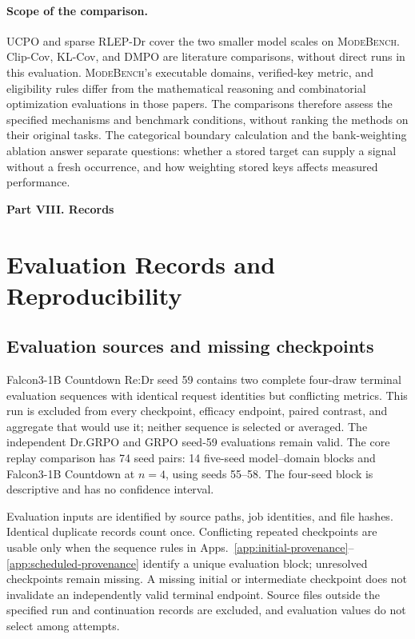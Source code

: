 \documentclass{article}
\newcommand{\1}{\mathbf 1}
\newcommand{\mb}{\textsc{ModeBench}}
\theoremstyle{remark}
\theoremstyle{definition}
\theoremstyle{plain}
\begin{document}
\paragraph{Scope of the comparison.}
UCPO and sparse RLEP-Dr cover the two smaller model scales on \mb{}.
Clip-Cov, KL-Cov, and DMPO are literature comparisons, without direct runs
in this evaluation. \mb{}'s executable domains, verified-key metric, and
eligibility rules differ from the mathematical reasoning and combinatorial
optimization evaluations in those papers. The comparisons therefore assess
the specified mechanisms and benchmark conditions, without ranking the
methods on their original tasks. The categorical boundary calculation and
the bank-weighting ablation answer separate questions: whether a stored
target can supply a signal without a fresh occurrence, and how weighting
stored keys affects measured performance.

\clearpage
{}
\begin{center}\large\textbf{Part VIII. Records}\end{center}

\section{Evaluation Records and Reproducibility}
\label{app:reproducibility}

\subsection{Evaluation sources and missing checkpoints}
\label{app:source-integrity}

Falcon3-1B Countdown Re:Dr seed 59 contains two complete four-draw
terminal evaluation sequences with identical request identities but
conflicting metrics. This run is excluded from every checkpoint,
efficacy endpoint, paired contrast, and aggregate that would use it;
neither sequence is selected or averaged. The independent Dr.GRPO and
GRPO seed-59 evaluations remain valid. The core replay comparison has
74 seed pairs: 14 five-seed model--domain blocks and Falcon3-1B
Countdown at $n=4$, using seeds 55--58. The four-seed block is
descriptive and has no confidence interval.

Evaluation inputs are identified by source paths, job identities, and file
hashes. Identical duplicate records count once. Conflicting repeated
checkpoints are usable only when the sequence rules in
Apps.~\ref{app:initial-provenance}--\ref{app:scheduled-provenance}
identify a unique evaluation block; unresolved checkpoints remain missing.
A missing initial or intermediate checkpoint does not invalidate an
independently valid terminal endpoint. Source files outside the specified
run and continuation records are excluded, and evaluation values do not
select among attempts.
\end{document}

